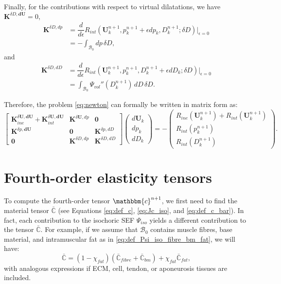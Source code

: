 \documentclass{sfuthesis}
\numberwithin{equation}{section}
\numberwithin{figure}{chapter}
\numberwithin{table}{chapter}
\theoremstyle{definition}
\def\*#1{{\mathbf{#1}}} %
\newcommand{\der}[2]{\dfrac{d #1}{d #2}}
\newcommand{\B}{\mathcal{B}}
\newcommand{\C}{\mathbb{C}}
\renewcommand{\c}{\mathbbm{c}}
\begin{document}
Finally, for the contributions with respect to virtual dilatations, we have $\*K^{\delta D, \*d\*U} = 0$, 
\begin{equation}
\begin{aligned}
\*K^{\delta D, dp} &= \der{}{\epsilon} R_{int}(\*U^{n+1}_k, p^{n+1}_k + \epsilon dp_k, D^{n+1}_k; \delta D) \Big|_{\epsilon=0}  \\
&= -\int_{\B_0}  dp \, \delta D,
\end{aligned}
\end{equation}
and
\begin{equation}
\begin{aligned}
\*K^{\delta D, dD} &= \der{}{\epsilon}R_{int}(\*U^{n+1}_k, p^{n+1}_k, D^{n+1}_k + \epsilon dD_k ; \delta D) \Big|_{\epsilon=0} \\
&= \int_{\B_0} \Psi_{vol}''(D^{n+1}_k) \, dD \, \delta D.
\end{aligned}
\end{equation}

Therefore, the problem \eqref{eq:newton} can formally be written in matrix form as:
\begin{equation} \label{eq:LF_linear_system}
    \left[\begin{matrix}
    \*K_{ine}^{\delta \*U, \*d\*U} + \*K_{int}^{\delta \*U, \*d\*U} & \*K^{\delta \*U, dp} & \*0 \\
    \*K^{\delta p, \*d\*U} & \*0 & \*K^{\delta p, dD} \\
    \*0 & \*K^{\delta D, dp} & \*K^{\delta D, dD}
    \end{matrix}\right] 
    \left( \begin{matrix}
      d\*U_k \\ dp_k \\ dD_k
    \end{matrix}\right) = -
    \left(\begin{matrix}
      R_{ine}(\*U^{n+1}_k) + R_{int}(\*U^{n+1}_k) \\
      R_{int}(p^{n+1}_k)\\
      R_{int}(D^{n+1}_k)
    \end{matrix}\right).
\end{equation}

\section{Fourth-order elasticity tensors} \label{sec:elasticity_tensors}

To compute the fourth-order tensor $\c^{n+1}$, we first need to find the material tensor $\bar{\C}$ (see Equations \eqref{eq:def_c}, \eqref{eq:Jc_iso}, and \eqref{eq:def_c_bar}). In fact, each contribution to the isochoric SEF $\Psi_{iso}$ yields a different contribution to the tensor $\bar{\C}$. For example, if we assume that $\B_0$ contains muscle fibres, base material, and intramuscular fat as in \eqref{eq:def_Psi_iso_fibre_bm_fat}, we will have:
\begin{equation}
    \bar{\C} = (1-\chi_{fat})(\bar{\C}_{fibre} + \bar{\C}_{bm}) + \chi_{fat} \bar{\C}_{fat},
\end{equation}
with analogous expressions if ECM, cell, tendon, or aponeurosis tissues are included. 
\end{document}
